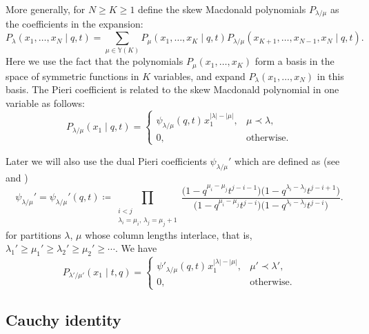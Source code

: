 More generally, for $N\ge K\ge1$
define the skew Macdonald polynomials
$P_{\lambda/\mu}$
as the coefficients
in the expansion:
\begin{equation*}
	P_\lambda(x_1,\dots,x_N \mid q,t)=
	\sum_{\mu\in \mathbb{Y}(K)}
	P_\mu(x_1,\dots,x_K \mid q,t )
	P_{\lambda/\mu}(x_{K+1},\dots,x_{N-1},x_N \mid q,t ).
\end{equation*}
Here we use the fact that
the polynomials
$P_\mu(x_1,\dots,x_K )$
form a basis in the space of symmetric functions in $K$ variables, and
expand
$P_\lambda(x_1,\dots,x_N )$
in this basis.
The Pieri coefficient is related to the skew Macdonald polynomial
in one variable as follows:
\begin{equation*}%
	P_{\lambda/\mu}(x_1\mid q,t)=
	\begin{cases}
		\psi_{\lambda/\mu}(q,t)\hspace{1pt} x_1^{|\lambda|-|\mu|},&\mu\prec \lambda,\\
		0,&\text{otherwise}.
	\end{cases}
\end{equation*}

Later we will also use the dual Pieri coefficients
$\psi_{\lambda/\mu}'$ which are defined as
(see \cite[formula~(VI.6.24.iv)]{Macdonald1995} and
\cite[formula~(2.12)]{BorodinCorwin2011Macdonald})
\begin{equation}
	\label{eq:psi_prime_Pieri}
	\psi_{\lambda/\mu}'=
	\psi_{\lambda/\mu}'(q,t)
	\coloneqq
	\prod_{\substack{i<j \\ \lambda_{i}=\mu_{i},\, \lambda_{j}=\mu_{j}+1}}
	\frac{\big(1-q^{\mu_{i}-\mu_{j}} t^{j-i-1}\big)\big(1-q^{\lambda_{i}-\lambda_{j}} t^{j-i+1}\big)}
	{\big(1-q^{\mu_{i}-\mu_{j}} t^{j-i}\big)\big(1-q^{\lambda_{i}-\lambda_{j}} t^{j-i}\big)}.
\end{equation}
for partitions $\lambda$, $\mu$ whose column lengths interlace,
that is,
$\lambda_1'\ge \mu_1'\ge \lambda_2'\ge \mu_2'\ge \cdots $.
We have
\begin{equation}
	\label{eq:P_skew_single_variable_dual}
	P_{\lambda'/\mu'}(x_1 \mid t,q)=
	\begin{cases}
		\psi'_{\lambda/\mu}(q,t)\hspace{1pt} x_1^{|\lambda|-|\mu|}
		,&\mu'\prec \lambda',\\
		0
		,&\text{otherwise}.
	\end{cases}
\end{equation}

\subsection{Cauchy identity}\label{sub:Cauchy_and_Dyson1}

